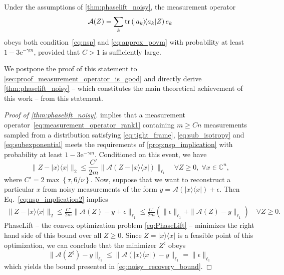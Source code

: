 \begin{proposition} \label{prop:RECR_nsp}
  Under the assumptions of \cref{thm:phaselift_noisy}, the measurement operator
  \[
    \label{eq:measurement_operator_rank1}
    \mathcal{A}(Z) = \sum_k \tr \left(\ket{ a_k}\bra{ a_k} Z\right)  e_k
  \]
  obeys both condition~\eqref{eq:nsp} and \eqref{eq:approx_povm} with probability at least $1- 3\mathrm{e}^{-\gamma m}$, provided that $C >1$ is sufficiently large.
\end{proposition}

We postpone the proof of this statement to \cref{sec:proof_measurement_operator_is_good} and directly derive \cref{thm:phaselift_noisy} -- which constitutes the main theoretical achievement of this work -- from this statement.

\begin{proof}[Proof of \cref{thm:phaselift_noisy}]
 implies that a measurement operator~\eqref{eq:measurement_operator_rank1} containing $m \geq C n$ measurements sampled from a distribution satisfying \eqref{eq:tight_frame}, \eqref{eq:sub_isotropy} and \eqref{eq:subexponential} meets the requirements of \cref{prop:nsp_implication} with probability at least $1-3 \mathrm{e}^{-\gamma m}$.
Conditioned on this event, we have
\[
\| Z - |{x} \rangle \! \langle {x}| \|_2 \leq \frac{C'}{2m}  \| \mathcal{A}(Z - |{x} \rangle \! \langle {x}|) \|_{\ell_1} \quad \forall Z \geq 0,\; \forall {x} \in \mathbb{C}^n,
\label{eq:nsp_implication2}
\]
where $C' = 2 \max \left\{\tau, 6/\nu \right\}$.
Now, suppose that we want to reconstruct a particular ${x}$ from noisy measurements of the form ${y} = \mathcal{A} (|{x} \rangle \! \langle {x}|) + {\epsilon}$. Then Eq.~\eqref{eq:nsp_implication2} implies
\begin{align*}
\| Z - |{x} \rangle \! \langle {x}| \|_2 \leq \frac{C'}{2m} \| \mathcal{A}(Z) - {y} + {\epsilon} \|_{\ell_1}
\leq \frac{C'}{2m} \left( \| {\epsilon} \|_{\ell_1} + \| \mathcal{A}(Z) - {y} \|_{\ell_1} \right)\quad \forall Z \geq 0.
\end{align*}
PhaseLift -- the convex optimization problem \eqref{eq:PhaseLift} -- minimizes the right hand side of this bound over all $Z \geq 0$. Since $Z = |{x} \rangle \! \langle {x}|$ is a feasible point of this optimization, we can conclude that the minimizer $Z^\sharp$ obeys
\begin{equation*}
\| \mathcal{A}(Z^\sharp) - {y} \|_{\ell_1} \leq \| \mathcal{A}(|{x} \rangle \! \langle {x}|)-{y} \|_{\ell_1} = \| {\epsilon} \|_{\ell_1}
\end{equation*}
which yields the bound presented in \eqref{eq:noisy_recovery_bound}.
\end{proof}


